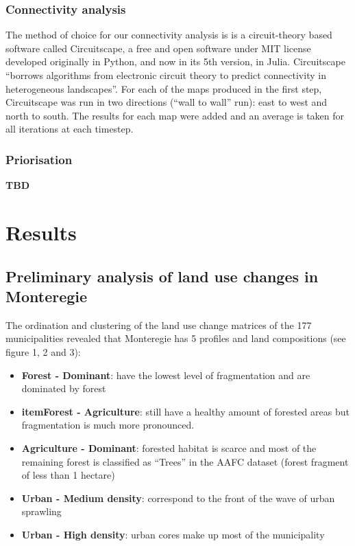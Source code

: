\subsubsection{Connectivity analysis}
The method of choice for our connectivity analysis is is a circuit-theory based software called Circuitscape, a free and open software under MIT license developed originally in Python, and now in its 5th version, in Julia.  Circuitscape “borrows algorithms from electronic circuit theory to predict connectivity in heterogeneous landscapes”.
For each of the maps produced in the first step, Circuitscape was run in two directions (“wall to wall” run): east to west and north to south. The results for each map were added and an average is taken for all iterations at each timestep.\\

\subsubsection{Priorisation}
\textbf{TBD}
\\

\section{Results}

\subsection{Preliminary analysis of land use changes in Monteregie}
The ordination and clustering of the land use change matrices of the 177 municipalities revealed that Monteregie has 5 profiles and land compositions (see figure 1, 2 and 3):
\begin{itemize}
  \item \textbf{Forest - Dominant}: have the lowest level of fragmentation and are dominated by forest
  \item \textbf{itemForest - Agriculture}: still have a healthy amount of forested areas but fragmentation is much more pronounced.
  \item \textbf{Agriculture - Dominant}: forested habitat is scarce and most of the remaining forest is classified as “Trees” in the AAFC dataset (forest fragment of less than 1 hectare)
  \item \textbf{Urban - Medium density}: correspond to the front of the wave of urban sprawling
  \item \textbf{Urban - High density}: urban cores make up most of the municipality
\end{itemize}

